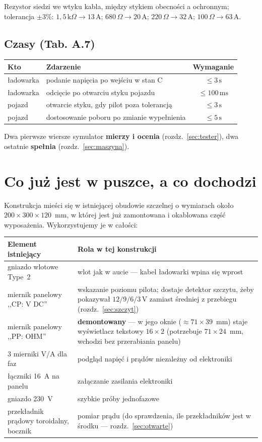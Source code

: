 \documentclass[a4paper,11pt]{article}
\newcommand{\ohm}{\,\Omega}
\newcommand{\kohm}{\,\mathrm{k}\Omega}
\newcommand{\volt}{\,\mathrm{V}}
\newcommand{\amp}{\,\mathrm{A}}
\newcommand{\ms}{\,\mathrm{ms}}
\newcommand{\sek}{\,\mathrm{s}}
\begin{document}
Rezystor siedzi we wtyku kabla, między stykiem obecności a ochronnym; tolerancja
$\pm3\%$: $1{,}5\kohm \to 13\amp$; $680\ohm \to 20\amp$; $220\ohm \to 32\amp$;
$100\ohm \to 63\amp$.

\subsection{Czasy (Tab. A.7)}

\begin{center}
\begin{tabular}{llc}
\toprule
Kto & Zdarzenie & Wymaganie \\
\midrule
ładowarka & podanie napięcia po wejściu w stan C & $\le 3\sek$ \\
ładowarka & odcięcie po otwarciu styku pojazdu   & $\le 100\ms$ \\
pojazd    & otwarcie styku, gdy pilot poza tolerancją & $\le 3\sek$ \\
pojazd    & dostosowanie poboru po zmianie wypełnienia & $\le 5\sek$ \\
\bottomrule
\end{tabular}
\end{center}

Dwa pierwsze wiersze symulator \textbf{mierzy i ocenia} (rozdz.~\ref{sec:tester}),
dwa ostatnie \textbf{spełnia} (rozdz.~\ref{sec:maszyna}).

\section{Co już jest w puszce, a co dochodzi}

Konstrukcja mieści się w istniejącej obudowie szczelnej o wymiarach około
$200\times300\times120$~mm, w której jest już zamontowana i okablowana część
wyposażenia. Wykorzystujemy je w całości:

\begin{center}
\begin{tabular}{p{5.2cm}p{10.0cm}}
\toprule
Element istniejący & Rola w tej konstrukcji \\
\midrule
gniazdo wlotowe Type~2 & wlot jak w aucie --- kabel ładowarki wpina się wprost \\
miernik panelowy ,,CP: V DC'' & wskazanie poziomu pilota; dostaje detektor
  szczytu, żeby pokazywał $12/9/6/3\volt$ zamiast średniej z przebiegu
  (rozdz.~\ref{sec:szczyt}) \\
miernik panelowy ,,PP: OHM'' & \textbf{demontowany} --- w jego oknie
  ($\approx 71\times39$~mm) staje wyświetlacz tekstowy $16\times2$
  (potrzebuje $71\times24$~mm, wchodzi bez przerabiania panelu) \\
3 mierniki V/A dla faz & podgląd napięć i prądów niezależny od elektroniki \\
łączniki 16~A na panelu & załączanie zasilania elektroniki \\
gniazdo 230~V & szybkie próby jednofazowe \\
przekładnik prądowy toroidalny, bocznik & pomiar prądu (do sprawdzenia, ile
  przekładników jest w środku --- rozdz.~\ref{sec:otwarte}) \\
\bottomrule
\end{tabular}
\end{center}
\end{document}
